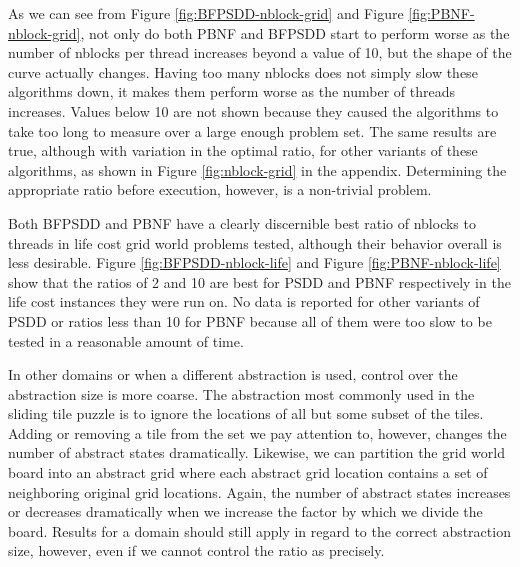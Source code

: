 \documentclass{article}
\begin{document}
As we can see from Figure \ref{fig:BFPSDD-nblock-grid} and Figure \ref{fig:PBNF-nblock-grid}, not only do both PBNF and BFPSDD start to perform worse as the number of nblocks per thread increases beyond a value of 10, but the shape of the curve actually changes. Having too many nblocks does not simply slow these algorithms down, it makes them perform worse as the number of threads increases. Values below 10 are not shown because they caused the algorithms to take too long to measure over a large enough problem set. The same results are true, although with variation in the optimal ratio, for other variants of these algorithms, as shown in Figure \ref{fig:nblock-grid} in the appendix. Determining the appropriate ratio before execution, however, is a non-trivial problem.



Both BFPSDD and PBNF have a clearly discernible best ratio of nblocks to threads in life cost grid world problems tested, although their behavior overall is less desirable. Figure \ref{fig:BFPSDD-nblock-life} and Figure  \ref{fig:PBNF-nblock-life} show that the ratios of 2 and 10 are best for PSDD and PBNF respectively in the life cost instances they were run on. No data is reported for other variants of PSDD or ratios less than 10 for PBNF because all of them were too slow to be tested in a reasonable amount of time.

In other domains or when a different abstraction is used, control over the abstraction size is more coarse. The abstraction most commonly used in the sliding tile puzzle is to ignore the locations of all but some subset of the tiles. Adding or removing a tile from the set we pay attention to, however, changes the number of abstract states dramatically. Likewise, we can partition the grid world board into an abstract grid where each abstract grid location contains a set of neighboring original grid locations. Again, the number of abstract states increases or decreases dramatically when we increase the factor by which we divide the board. Results for a domain should still apply in regard to the correct abstraction size, however, even if we cannot control the ratio as precisely.
\end{document}

